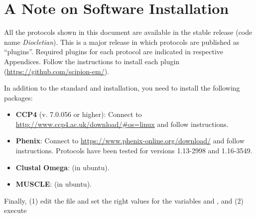 \section{A Note on Software Installation}
  All the protocols shown in this document are available in the stable \scipion release  (code name \textit{Diocletian}). This is a major release in which protocols are published as ``plugins''. Required plugins for each protocol are indicated in respective Appendices. Follow the instructions to install each plugin (\url{https://github.com/scipion-em/}).


  In addition to the standard \scipion and  installation, you need to install the following packages:
  
  \begin{itemize}
   \item\textbf{CCP4} (v. 7.0.056 or higher): Connect to \url{http://www.ccp4.ac.uk/download/#os=linux} and follow instructions.
   \item\textbf{Phenix}: Connect to \url{https://www.phenix-online.org/download/} and follow instructions. Protocols have been tested for versions
   1.13-2998 and 1.16-3549.
   \item\textbf{Clustal Omega}:  (in ubuntu).
   \item\textbf{MUSCLE}:  (in ubuntu).
  \end{itemize}

  
  Finally, (1) edit the file  and set the right values for the variables  and , and (2) execute 
